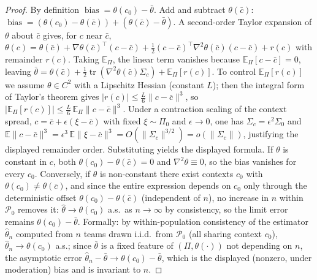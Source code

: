 \documentclass{amsart}
\theoremstyle{definition}
\begin{document}
\begin{proof}
By definition $\operatorname{bias}=\theta(c_0)-\bar\theta$. Add and subtract
$\theta(\bar c)$: $\operatorname{bias}=(\theta(c_0)-\theta(\bar c)) +
(\theta(\bar c)-\bar\theta)$. A second-order Taylor expansion of
$\theta$ about $\bar c$ gives, for $c$ near $\bar c$,
$\theta(c)=\theta(\bar c)+\nabla\theta(\bar c)^{\!\top}(c-\bar c)
+\tfrac12 (c-\bar c)^{\!\top}\nabla^2\theta(\bar c)(c-\bar c)+r(c)$ with
remainder $r(c)$. Taking $\mathbb{E}_\Pi$, the linear term vanishes
because $\mathbb{E}_\Pi[c-\bar c]=0$, leaving
$\bar\theta=\theta(\bar c)+\tfrac12\operatorname{tr}(\nabla^2\theta(\bar c)\Sigma_c)+\mathbb{E}_\Pi[r(c)]$.
To control $\mathbb{E}_\Pi[r(c)]$ we assume $\theta\in C^2$ with a
Lipschitz Hessian (constant $L$); then the integral form of Taylor's
theorem gives $|r(c)|\le \tfrac{L}{6}\|c-\bar c\|^3$, so
$|\mathbb{E}_\Pi[r(c)]|\le\tfrac{L}{6}\,\mathbb{E}_\Pi\|c-\bar c\|^3$.
Under a contraction scaling of the context spread,
$c=\bar c+\epsilon(\xi-\bar c)$ with fixed $\xi\sim\Pi_0$ and $\epsilon\to0$,
one has $\Sigma_c=\epsilon^2\Sigma_0$ and
$\mathbb{E}\|c-\bar c\|^3=\epsilon^3\,\mathbb{E}\|\xi-\bar c\|^3
=O(\|\Sigma_c\|^{3/2})=o(\|\Sigma_c\|)$, justifying the displayed remainder
order.
Substituting yields the displayed formula. If $\theta$ is constant in $c$,
both $\theta(c_0)-\theta(\bar c)=0$ and $\nabla^2\theta\equiv0$, so the bias
vanishes for every $c_0$. Conversely, if $\theta$ is non-constant there exist
contexts $c_0$ with $\theta(c_0)\neq\theta(\bar c)$, and since the entire
expression depends on $c_0$ only through the deterministic offset
$\theta(c_0)-\theta(\bar c)$ (independent of $n$), no increase in $n$ within
$\mathcal{P}_0$ removes it: $\widehat\theta\to\theta(c_0)$ a.s.\ as
$n\to\infty$ by consistency, so the limit error remains
$\theta(c_0)-\bar\theta$. Formally: by within-population consistency of the
estimator $\widehat\theta_n$ computed from $n$ teams drawn i.i.d.\ from
$\mathcal P_0$ (all sharing context $c_0$), $\widehat\theta_n\to\theta(c_0)$
a.s.; since $\bar\theta$ is a fixed feature of $(\Pi,\theta(\cdot))$ not
depending on $n$, the asymptotic error $\widehat\theta_n-\bar\theta\to
\theta(c_0)-\bar\theta$, which is the displayed (nonzero, under moderation)
bias and is invariant to $n$.
\end{proof}
\end{document}
